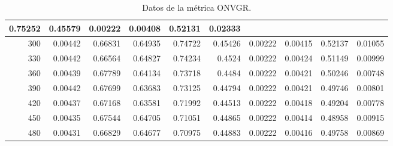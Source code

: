 \begin{table}[h]
\begin{tabular}{|r|r|r|r|r|r|r|r|r|r|}
{        0.75252}    &{\tiny 0.45579}    &{\tiny 0.00222}    &{\tiny 0.00408}    &{\tiny 0.52131}
        &{\tiny 0.02333} \\
        \hline \tiny 300 &{\tiny 0.00442}    &{\tiny 0.66831}    &{\tiny 0.64935}    &{\tiny
        0.74722}    &{\tiny 0.45426}    &{\tiny 0.00222}    &{\tiny 0.00415}    &{\tiny 0.52137}
        &{\tiny 0.01055} \\
        \hline \tiny 330 &{\tiny 0.00442}    &{\tiny 0.66564}    &{\tiny 0.64827}    &{\tiny
        0.74234}    &{\tiny 0.4524}    &{\tiny 0.00222}    &{\tiny 0.00424}    &{\tiny 0.51149}
        &{\tiny 0.00999} \\
        \hline \tiny 360 &{\tiny 0.00439}    &{\tiny 0.67789}    &{\tiny 0.64134}    &{\tiny
        0.73718}    &{\tiny 0.4484}    &{\tiny 0.00222}    &{\tiny 0.00421}    &{\tiny 0.50246}
        &{\tiny 0.00748} \\
        \hline \tiny 390 &{\tiny 0.00442}    &{\tiny 0.67699}    &{\tiny 0.63683}    &{\tiny
        0.73125}    &{\tiny 0.44794}    &{\tiny 0.00222}    &{\tiny 0.00421}    &{\tiny 0.49746}
        &{\tiny 0.00801} \\
        \hline \tiny 420 &{\tiny 0.00437}    &{\tiny 0.67168}    &{\tiny 0.63581}    &{\tiny
        0.71992}    &{\tiny 0.44513}    &{\tiny 0.00222}    &{\tiny 0.00418}    &{\tiny 0.49204}
        &{\tiny 0.00778} \\
        \hline \tiny 450 &{\tiny 0.00435}    &{\tiny 0.67544}    &{\tiny 0.64705}    &{\tiny
        0.71051}    &{\tiny 0.44865}    &{\tiny 0.00222}    &{\tiny 0.00414}    &{\tiny 0.48958}
        &{\tiny 0.00915} \\
        \hline \tiny 480 &{\tiny 0.00431}    &{\tiny 0.66829}    &{\tiny 0.64677}    &{\tiny
        0.70975}    &{\tiny 0.44883}    &{\tiny 0.00222}    &{\tiny 0.00416}    &{\tiny 0.49758}
        &{\tiny 0.00869} \\
        \hline
    \end{tabular}
    \caption{Datos de la m\'etrica ONVGR.}
    \label{tabA6}
\end{table}


